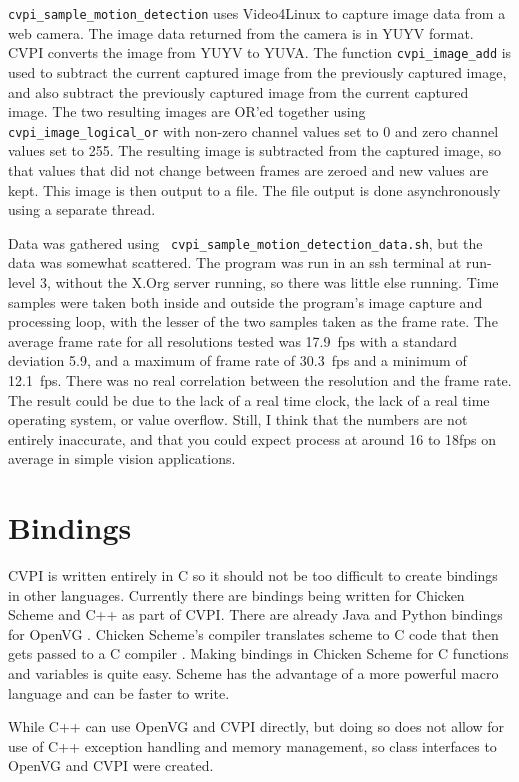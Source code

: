 \documentclass[12pt]{report}
\begin{document}
{\tt cvpi\_sample\-\_motion\_detection} uses Video4Linux to capture
image data from a web camera. The image data returned from the camera
is in YUYV format. CVPI converts the image from YUYV to YUVA. The
function {\tt cvpi\_image\_add} is used to subtract the current
captured image from the previously captured image, and also subtract
the previously captured image from the current captured image. The two
resulting images are OR'ed together using {\tt
  cvpi\_image\_logical\_or} with non-zero channel values set to 0 and
zero channel values set to 255. The resulting image is subtracted from
the captured image, so that values that did not change between frames
are zeroed and new values are kept. This image is then output to a
file. The file output is done asynchronously using a separate thread.

Data was gathered using {\tt
  cvpi\_sample\-\_motion\_detection\-\_data.sh}, but the data was somewhat
scattered. The program was run in an ssh terminal at run-level 3,
without the X.Org server running, so there was little else
running. Time samples were taken both inside and outside the program's
image capture and processing loop, with the lesser of the two samples
taken as the frame rate.  The average frame rate for all resolutions
tested was 17.9~fps with a standard deviation 5.9, and a maximum of
frame rate of 30.3~fps and a minimum of 12.1~fps. There was no real
correlation between the resolution and the frame rate. The result
could be due to the lack of a real time clock, the lack of a real time
operating system, or value overflow. Still, I think that the numbers
are not entirely inaccurate, and that you could expect process at around 16
to 18fps on average in simple vision applications.

\chapter{Bindings}
\label{sec-9}
CVPI is written entirely in C so it should not be too difficult to
create bindings in other languages. Currently there are bindings being
written for Chicken Scheme and C++ as part of CVPI. There are already
Java and Python bindings for OpenVG \cite{rPiVid}. Chicken Scheme's compiler
translates scheme to C code that then gets passed to a C
compiler \cite{chicken}. Making bindings in Chicken Scheme for C functions and
variables is quite easy. Scheme has the advantage of a more powerful
macro language and can be faster to write.

While C++ can use OpenVG and CVPI directly, but doing so does not allow
for use of C++ exception handling and memory management, so class
interfaces to OpenVG and CVPI were created.
\end{document}
